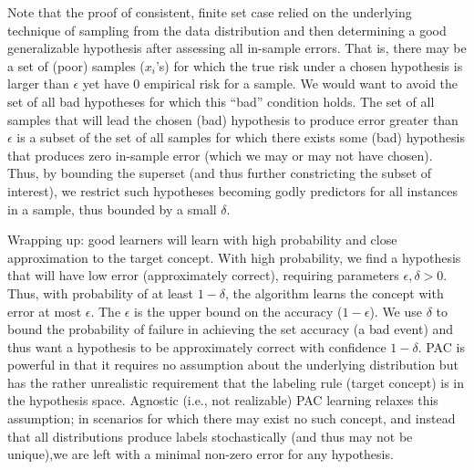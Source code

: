 Note that the proof of consistent, finite set case relied on the underlying
technique of sampling from the
data distribution and then determining a good generalizable hypothesis after
assessing all in-sample errors. That is,
there may be a set of (poor) samples ($x_i$'s) for which the true risk under a
chosen hypothesis is larger than $\epsilon$ yet have 0 empirical risk for a
sample. We would want to avoid the set of
all bad hypotheses
for which this ``bad'' condition holds. The set of all
samples that will lead the
chosen (bad) hypothesis to produce error greater than $\epsilon$ is a subset of
the set of all samples for which there exists some (bad) hypothesis that
produces zero in-sample error (which we may or may not have chosen). Thus, by
bounding the
superset (and thus further constricting the subset of interest), we restrict
such hypotheses becoming godly predictors for all instances in a sample, thus
bounded by a small $\delta$.\par
Wrapping up: good learners will learn with high probability and close
approximation to the
target concept. With high probability, we find a hypothesis that will have low
error (approximately correct), requiring parameters $\epsilon, \delta > 0$.
Thus, with probability of at least $1-\delta$, the algorithm learns the concept
with error at most $\epsilon$. The $\epsilon$ is the upper bound on the
accuracy ($1-\epsilon$). We use $\delta$ to bound the probability of failure in
achieving the set accuracy (a bad event) and thus want a hypothesis to be
approximately correct with confidence $1-\delta$. PAC is powerful in that it
requires no assumption about
the underlying distribution but has the rather unrealistic requirement that the
labeling rule (target concept)
is in the hypothesis space. Agnostic (i.e., not realizable) PAC learning
relaxes this assumption; in scenarios for which there may exist no such
concept,
and instead that all distributions produce labels stochastically (and thus may
not be unique),we are left with a minimal non-zero
error for any hypothesis.\par

